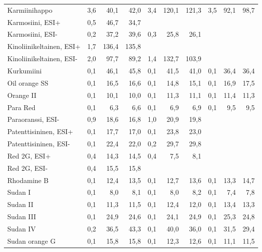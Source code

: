 \begin{table}[htbp]
\begin{tabular}{lrrrrrrrrr}
    Karmiinihappo & 3,6   & 40,1  & 42,0  & 3,4   & 120,1 & 121,3 & 3,5   & 92,1  & 98,7 \\
    Karmosiini, ESI+ & 0,5   & 46,7  & 34,7  &       &       &       &       &       &  \\
    Karmosiini, ESI- & 0,2   & 37,2  & 39,6  & 0,3   & 25,8  & 26,1  &       &       &  \\
    Kinoliinikeltainen, ESI+ & 1,7   & 136,4 & 135,8 &       &       &       &       &       &  \\
    Kinoliinikeltainen, ESI- & 2,0   & 97,7  & 89,2  & 1,4   & 132,7 & 103,9 &       &       &  \\
    Kurkumiini & 0,1   & 46,1  & 45,8  & 0,1   & 41,5  & 41,0  & 0,1   & 36,4  & 36,4 \\
    Oil orange SS & 0,1   & 16,5  & 16,6  & 0,1   & 14,8  & 15,1  & 0,1   & 16,9  & 17,5 \\
    Orange II & 0,1   & 10,1  & 10,0  & 0,1   & 11,3  & 11,1  & 0,1   & 11,4  & 11,3 \\
    Para Red & 0,1   & 6,3   & 6,6   & 0,1   & 6,9   & 6,9   & 0,1   & 9,5   & 9,5 \\
    Paraoranssi, ESI- & 0,9   & 18,6  & 16,8  & 1,0   & 20,9  & 19,8  &       &       &  \\
    Patenttisininen, ESI+ & 0,1   & 17,7  & 17,0  & 0,1   & 23,8  & 23,0  &       &       &  \\
    Patenttisininen, ESI- & 0,1   & 22,4  & 22,0  & 0,2   & 29,7  & 29,8  &       &       &  \\
    Red 2G, ESI+  & 0,4   & 14,3  & 14,5  & 0,4   & 7,5   & 8,1   &       &       &  \\
    Red 2G, ESI- & 0,4   & 15,5  & 15,8  &       &       &       &       &       &  \\
    Rhodamine B & 0,1   & 12,4  & 13,5  & 0,1   & 12,7  & 13,6  & 0,1   & 13,3  & 14,7 \\
    Sudan I & 0,1   & 8,0   & 8,1   & 0,1   & 8,0   & 8,2   & 0,1   & 7,4   & 7,8 \\
    Sudan II & 0,1   & 11,3  & 11,5  & 0,1   & 12,4  & 12,0  & 0,1   & 13,4  & 13,3 \\
    Sudan III & 0,1   & 24,9  & 24,6  & 0,1   & 24,1  & 24,9  & 0,1   & 25,3  & 24,8 \\
    Sudan IV & 0,2   & 36,5  & 43,3  & 0,1   & 40,0  & 36,0  & 0,1   & 31,5  & 29,4 \\
    Sudan orange G & 0,1   & 15,8  & 15,8  & 0,1   & 12,3  & 12,6  & 0,1   & 11,1  & 11,5 \\

\end{tabular}
\end{table}
